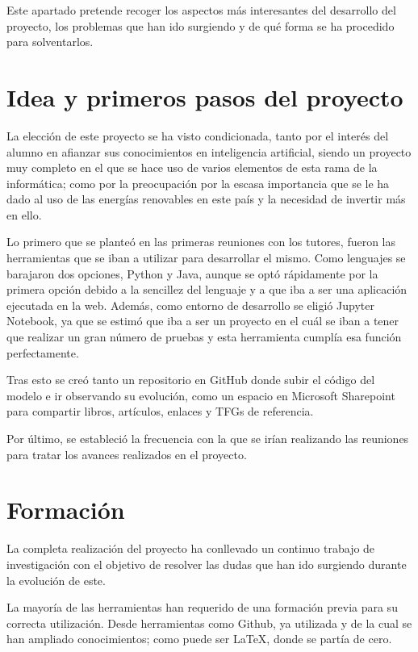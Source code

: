 
Este apartado pretende recoger los aspectos más interesantes del desarrollo del proyecto, los problemas que han ido surgiendo y de qué forma se ha procedido para solventarlos.


\section{Idea y primeros pasos del proyecto}

La elección de este proyecto se ha visto condicionada, tanto por el interés del alumno en afianzar sus conocimientos en inteligencia artificial, siendo un proyecto muy completo en el que se hace uso de varios elementos de esta rama de la informática; como por la preocupación por la escasa importancia que se le ha dado al uso de las energías renovables en este país y la necesidad de invertir más en ello.

Lo primero que se planteó en las primeras reuniones con los tutores, fueron las herramientas que se iban a utilizar para desarrollar el mismo. Como lenguajes se barajaron dos opciones, Python y Java, aunque se optó rápidamente por la primera opción debido a la sencillez del lenguaje y a que iba a ser una aplicación ejecutada en la web. 
Además, como entorno de desarrollo se eligió Jupyter Notebook, ya que se estimó que iba a ser un proyecto en el cuál se iban a tener que realizar un gran número de pruebas y esta herramienta cumplía esa función perfectamente.

Tras esto se creó tanto un repositorio en GitHub donde subir el código del modelo e ir observando su evolución, como un espacio en Microsoft Sharepoint para compartir libros, artículos, enlaces y TFGs de referencia.

Por último, se estableció la frecuencia con la que se irían realizando las reuniones para tratar los avances realizados en el proyecto.


\section{Formación}

La completa realización del proyecto ha conllevado un continuo trabajo de investigación con el objetivo de resolver las dudas que han ido surgiendo durante la evolución de este.

La mayoría de las herramientas han requerido de una formación previa para su correcta utilización. Desde herramientas como Github, ya utilizada y de la cual se han ampliado conocimientos; como puede ser \LaTeX, donde se partía de cero.


